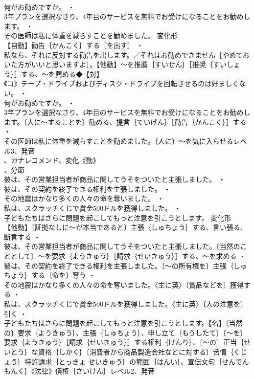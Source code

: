 \documentclass[8pt]{extreport}
\begin{document}
\begin{CJK}{UTF8}{min}
\\	何がお勧めですか。 ・
\\	3年プランを選択なさり、4年目のサービスを無料でお受けになることをお勧めします。 ・
\\	その医師は私に体重を減らすことを勧めました。	変化形 
\\	【自動】勧告｛かんこく｝する［を出す］ ・
\\	私なら、それに反対する勧告を出します。／それはお勧めできません［やめておいた方がいいと思いますよ］。【他動】～を推薦｛すいせん｝［推奨｛すいしょう｝］する、～を薦める◆【対】
\\	《コ》テープ・ドライブおよびディスク・ドライブを回転させるのは好ましくない。 ・
\\	何がお勧めですか。 ・
\\	3年プランを選択なさり、4年目のサービスを無料でお受けになることをお勧めします。〔人に～することを〕勧める、提言｛ていげん｝［勧告｛かんこく｝］する ・
\\	その医師は私に体重を減らすことを勧めました。〔人に〕～を気に入らせるレベル3、発音
\\	、カナレコメンド、変化《動》
\\	、分節
\\	彼は、その営業担当者が商品に関してうそをついたと主張しました。 ・
\\	彼は、その契約を終了できる権利を主張しました。 ・
\\	その地震はかなり多くの人々の命を奪いました。 ・
\\	私は、スクラッチくじで賞金500ドルを獲得しました。 ・
\\	子どもたちはさらに問題を起こしてもっと注意を引こうとします。	変化形 
\\	【他動】〔証拠なしに～が本当であると〕主張｛しゅちょう｝する、言い張る、断言する ・
\\	彼は、その営業担当者が商品に関してうそをついたと主張しました。〔当然のこととして〕～を要求｛ようきゅう｝［請求｛せいきゅう｝］する、～を求める ・
\\	彼は、その契約を終了できる権利を主張しました。〔～の所有権を〕主張｛しゅちょう｝する〔命を〕奪う ・
\\	その地震はかなり多くの人々の命を奪いました。〈主に英〉〔賞品などを〕獲得する ・
\\	私は、スクラッチくじで賞金500ドルを獲得しました。〈主に英〉〔人の注意を〕引く ・
\\	子どもたちはさらに問題を起こしてもっと注意を引こうとします。【名】〔当然の〕要求｛ようきゅう｝、主張｛しゅちょう｝、申し立て｛もうしたて｝〔～を〕要求｛ようきゅう｝［請求｛せいきゅう｝］する権利｛けんり｝、〔～の〕正当｛せいとう｝な資格｛しかく｝〔消費者から商品製造会社などに対する〕苦情｛くじょう｝特許請求｛とっきょ せいきゅう｝の範囲｛はんい｝、宣伝文句｛せんでん もんく｝《法律》債権｛さいけん｝レベル2、発音

\end{CJK}
\end{document}
